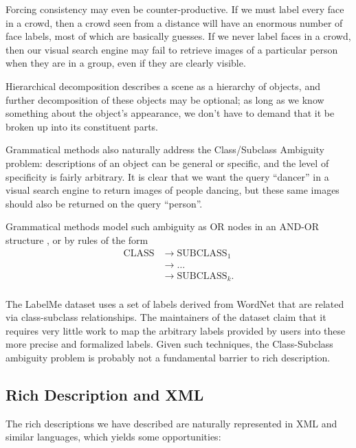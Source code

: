 Forcing consistency may even be counter-productive. If we must label
every face in a crowd, then a crowd seen from a distance will have an
enormous number of face labels, most of which are basically
guesses. If we never label faces in a crowd, then our visual search
engine may fail to retrieve images of a particular person when they
are in a group, even if they are clearly visible. 
  
Hierarchical decomposition describes a scene as a hierarchy of
objects, and further decomposition of these objects may be optional;
as long as we know something about the object's appearance, we don't
have to demand that it be broken up into its constituent parts.

\item Grammatical methods also naturally address the Class/Subclass
  Ambiguity problem: descriptions of an object can be general or
  specific, and the level of specificity is fairly arbitrary. It is
  clear that we want the query ``dancer'' in a visual search engine to
  return images of people dancing, but these same images should also
  be returned on the query ``person''. 

  Grammatical methods model such ambiguity as OR nodes in an AND-OR
  structure \cite{zhu-mumford}, or by rules of the form
\begin{align*}
\mathrm{CLASS} &\to \mathrm{SUBCLASS}_1\\
&\to \dots\\
&\to \mathrm{SUBCLASS}_k .\\
\end{align*}

The LabelMe dataset uses a set of labels derived from WordNet
\cite{wordnet} that are related via class-subclass
relationships. The maintainers of the dataset claim that it requires
very little work to map the arbitrary labels provided by users into
these more precise and formalized labels. \cite{labelme} Given
such techniques, the Class-Subclass ambiguity problem is probably not
a fundamental barrier to rich description.

\eitem

\subsection{Rich Description and XML}

The rich descriptions we have described are naturally represented in
XML and similar languages, which yields some opportunities: 

